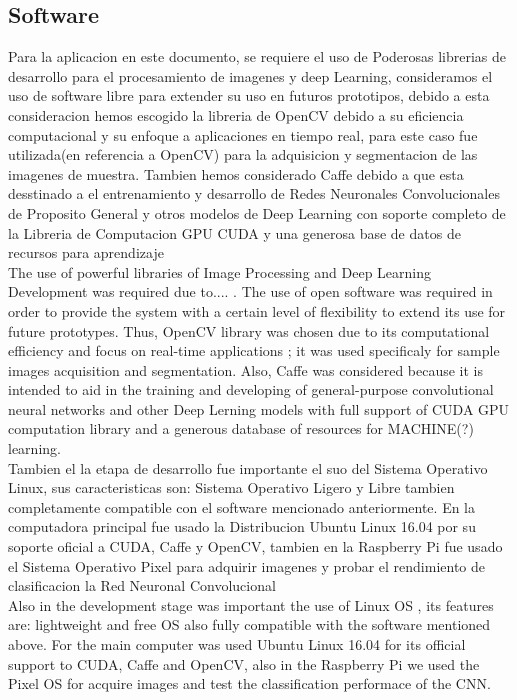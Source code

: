 \documentclass[conference]{IEEEtran}
\begin{document}
\subsection{Software}

Para la aplicacion en este documento, se requiere el uso de Poderosas librerias de desarrollo para el procesamiento de imagenes y deep Learning, consideramos el uso de software libre para extender su uso en futuros prototipos, debido a esta consideracion hemos escogido la libreria de OpenCV debido a su eficiencia computacional y su enfoque a aplicaciones en tiempo real, para este caso fue utilizada(en referencia a OpenCV) para la adquisicion y segmentacion de las imagenes de muestra. Tambien hemos considerado Caffe debido a que esta desstinado a el entrenamiento y desarrollo de Redes Neuronales Convolucionales de Proposito General y otros modelos de Deep Learning con soporte completo de la Libreria de Computacion GPU CUDA y una generosa base de datos de recursos para aprendizaje  \\

The use of powerful libraries of Image Processing and Deep Learning Development was required due to....  . The use of open software was required in order to provide the system with a certain level of flexibility to extend its use for future prototypes. Thus,  OpenCV library was chosen due to its computational efficiency and focus on real-time applications \cite{opencv_library}; it was used specificaly for sample images acquisition and segmentation. Also, Caffe was considered because it is intended to aid in the training and developing of general-purpose convolutional neural networks and other Deep Lerning models \cite{jia2014caffe} with full support of CUDA GPU computation library and a generous database of resources for MACHINE(?) learning.	
\\

Tambien el la etapa de desarrollo fue importante el suo del Sistema Operativo Linux, sus caracteristicas son: Sistema Operativo Ligero y Libre tambien completamente compatible con el software mencionado anteriormente. En la computadora principal fue usado la Distribucion Ubuntu Linux 16.04 por su soporte oficial a CUDA, Caffe y OpenCV, tambien en la Raspberry Pi fue usado el Sistema Operativo Pixel para adquirir imagenes y probar el rendimiento de clasificacion la Red Neuronal Convolucional \\

Also in the development stage was important the use of Linux OS , its features are: lightweight and free OS also fully compatible with the software mentioned above. For the main computer was used Ubuntu Linux 16.04 for its official support to CUDA, Caffe and OpenCV, also in the Raspberry Pi we used the Pixel OS for acquire images and test the classification performace of the CNN.
\\
\end{document}
